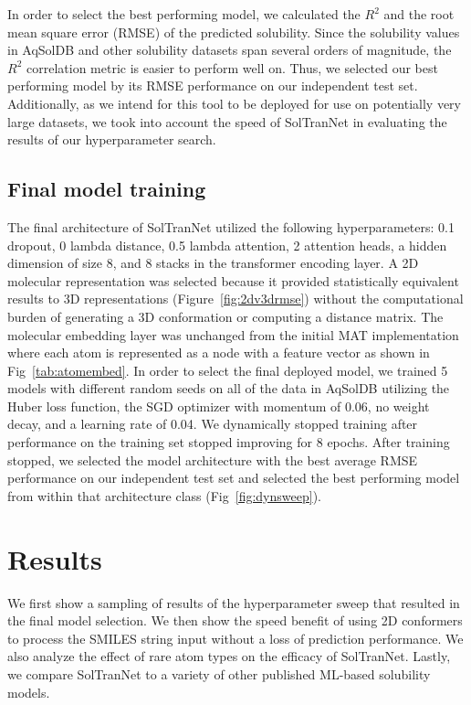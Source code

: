 \documentclass[journal=jmcmar,manuscript=article]{achemso}
\begin{document}
In order to select the best performing model, we calculated the $R^2$ and the root mean square error (RMSE) of the predicted solubility.
Since the solubility values in AqSolDB and other solubility datasets span several orders of magnitude, the $R^2$ correlation metric is easier to perform well on.
Thus, we selected our best performing model by its RMSE performance on our independent test set.
Additionally, as we intend for this tool to be deployed for use on potentially very large datasets, we took into account the speed of SolTranNet in evaluating the results of our hyperparameter search. 

\subsection{Final model training}
The final architecture of SolTranNet utilized the following hyperparameters: 0.1 dropout, 0 lambda distance, 0.5 lambda attention, 2 attention heads, a hidden dimension of size 8, and 8 stacks in the transformer encoding layer. A 2D molecular representation was selected because it provided statistically equivalent results to 3D representations (Figure~\ref{fig:2dv3drmse}) without the computational burden of generating a 3D conformation or computing a distance matrix.
The molecular embedding layer was unchanged from the initial MAT implementation\cite{MAT} where each atom is represented as a node with a feature vector as shown in Fig~\ref{tab:atomembed}.
In order to select the final deployed model, we trained 5 models with different random seeds on all of the data in AqSolDB utilizing the Huber loss function, the SGD optimizer with momentum of 0.06, no weight decay, and a learning rate of 0.04.
We dynamically stopped training after performance on the training set stopped improving for 8 epochs.
After training stopped, we selected the model architecture with the best average RMSE performance on our independent test set and selected the best performing model from within that architecture class (Fig~\ref{fig:dynsweep}).

\section{Results}

We first show a sampling of results of the hyperparameter sweep that resulted in the final model selection.
We then show the speed benefit of using 2D conformers to process the SMILES string input without a loss of prediction performance.
We also analyze the effect of rare atom types on the efficacy of SolTranNet.
Lastly, we compare SolTranNet to a variety of other published ML-based solubility models.
\end{document}
